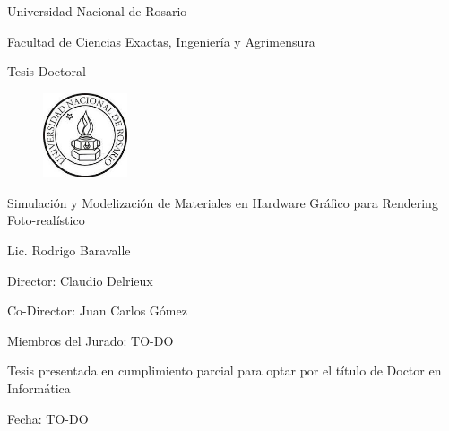 
\begin{titlepage}
\begin{center}

Universidad Nacional de Rosario

Facultad de Ciencias Exactas, Ingeniería y Agrimensura

Tesis Doctoral

\begin{figure}[h!]
\centering
\includegraphics[width=2.5cm]{figures/logounr}
\end{figure}

\vspace{2cm}


{\huge Simulación y Modelización de Materiales en Hardware Gráfico para Rendering Foto-realístico}
\vspace{2cm}

{\large Lic. Rodrigo Baravalle}
\vspace{2cm}

{\large Director: Claudio Delrieux}

{\large Co-Director: Juan Carlos Gómez}

\vspace{2cm}
{\large Miembros del Jurado: TO-DO}

\vspace{2cm}
{\large Tesis presentada en cumplimiento parcial para optar por el título de Doctor en Informática}

\vspace{1cm}
Fecha: TO-DO
\end{center}
\end{titlepage}

